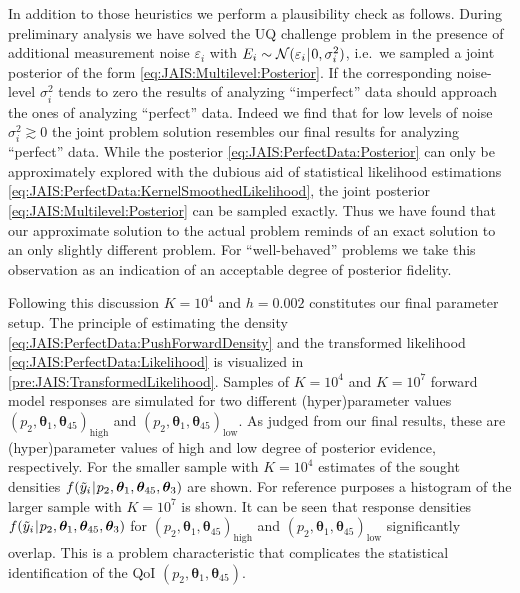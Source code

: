 \par %
In addition to those heuristics we perform a plausibility check as follows.
During preliminary analysis we have solved the UQ challenge problem in the presence of additional measurement noise \(\varepsilon_i\) with \(E_i \sim \mathcal{N}(\varepsilon_i {\:\!}|{\:\!} 0,\sigma^2_i)\),
i.e.\ we sampled a joint posterior of the form \cref{eq:JAIS:Multilevel:Posterior}.
If the corresponding noise-level \(\sigma^2_i\) tends to zero the results of analyzing ``imperfect'' data should approach the ones of analyzing ``perfect'' data.
Indeed we find that for low levels of noise \(\sigma^2_i \gtrsim 0\) the joint problem solution resembles our final results for analyzing ``perfect'' data.
While the posterior \cref{eq:JAIS:PerfectData:Posterior} can only be approximately explored with the dubious aid of statistical likelihood estimations
\cref{eq:JAIS:PerfectData:KernelSmoothedLikelihood}, the joint posterior \cref{eq:JAIS:Multilevel:Posterior} can be sampled exactly.
Thus we have found that our approximate solution to the actual problem reminds of an exact solution to an only slightly different problem.
For ``well-behaved'' problems we take this observation as an indication of an acceptable degree of posterior fidelity.
\par %
Following this discussion \(K=10^4\) and \(h=0.002\) constitutes our final parameter setup.
The principle of estimating the density \cref{eq:JAIS:PerfectData:PushForwardDensity} and the transformed likelihood \cref{eq:JAIS:PerfectData:Likelihood} is visualized in \cref{pre:JAIS:TransformedLikelihood}.
Samples of \(K=10^4\) and \(K=10^7\) forward model responses are simulated for two different (hyper)parameter values
\((p_2,\bm{\theta}_1,\bm{\theta}_{45})_{\mathrm{high}}\) and \((p_2,\bm{\theta}_1,\bm{\theta}_{45})_{\mathrm{low}}\).
As judged from our final results, these are (hyper)parameter values of high and low degree of posterior evidence, respectively.
For the smaller sample with \(K=10^4\) estimates of the sought densities \(f(\tilde{y}_i {\:\!}|{\:\!} p_2,\bm{\theta}_1,\bm{\theta}_{45},\bm{\theta}_3)\) are shown.
For reference purposes a histogram of the larger sample with \(K=10^7\) is shown.
It can be seen that response densities \(f(\tilde{y}_i {\:\!}|{\:\!} p_2,\bm{\theta}_1,\bm{\theta}_{45},\bm{\theta}_3)\)
for \((p_2,\bm{\theta}_1,\bm{\theta}_{45})_{\mathrm{high}}\) and \((p_2,\bm{\theta}_1,\bm{\theta}_{45})_{\mathrm{low}}\) significantly overlap.
This is a problem characteristic that complicates the statistical identification of the QoI \((p_2,\bm{\theta}_1,\bm{\theta}_{45})\).
